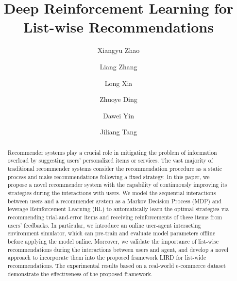 \documentclass[sigconf]{acmart}
\begin{document}
\title{Deep Reinforcement Learning for List-wise Recommendations}
\author{Xiangyu Zhao}

\author{Liang Zhang}

\author{Long Xia}

\author{Zhuoye Ding}

\author{Dawei Yin}

\author{Jiliang Tang}
\renewcommand{\shortauthors}{Xiangyu Zhao et al.}
\begin{abstract}
	Recommender systems play a crucial role in mitigating the problem of information overload by suggesting users' personalized items or services. The vast majority of traditional recommender systems consider the recommendation procedure as a static process and make recommendations following a fixed strategy. In this paper, we propose a novel recommender system with the capability of continuously improving its strategies during the interactions with users. We model the sequential interactions between users and a recommender system as a Markov Decision Process (MDP) and leverage Reinforcement Learning (RL) to automatically learn the optimal strategies via recommending trial-and-error items and receiving reinforcements of these items from users' feedbacks. In particular, we introduce an online user-agent interacting environment simulator, which can pre-train and evaluate model parameters offline before applying the model online. Moreover, we validate the importance of list-wise recommendations during the interactions between users and agent, and develop a novel approach to incorporate them into the proposed framework LIRD for list-wide recommendations. The experimental results based on a real-world e-commerce dataset demonstrate the effectiveness of the proposed framework. 
\end{abstract}



\maketitle








 
\end{document}
